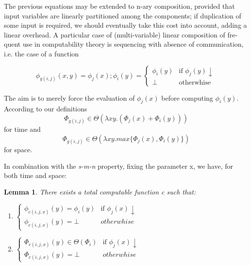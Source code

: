 \documentclass[10pt, a4paper, oneside, titlepage, draft]{article}
\newtheorem{lemma}[shrd]{Lemma}
\begin{document}
The previous equations may be extended to n-ary composition, provided that input variables are linearly partitioned among the components; if duplication of some input is required, we should eventually take this cost into account, adding a linear overhead. A particular case of (multi-variable) linear composition of fre- quent use in computability theory is sequencing with absence of communication, i.e. the case of a function

\begin{equation*}
    \phi_{g(i,j)}(x,y) = \phi_j(x);\phi_i(y) = 
    \begin{cases}
        \phi_i(y)   & \text{if } \phi_j(y)\downarrow    \\
        \bot        & \text{otherwhise}
    \end{cases}
\end{equation*}

\noindent The aim is to merely force the evaluation of $\phi_j(x)$ before computing $\phi_i(y)$. According to our definitions
\begin{equation*}
    \Phi_{g(i,j)} \in \Theta ( \lambda xy . ( \Phi_j(x) + \Phi_i(y) ) )
\end{equation*}
for time and
\begin{equation*}
    \Phi_{g(i,j)} \in \Theta ( \lambda xy . max \{ \Phi_j(x) , \Phi_i(y) \} )
\end{equation*}
for space.

In combination with the \emph{s-m-n} property, fixing the parameter x, we have, for both time and space:

\begin{lemma}
    There exists a total computable function c such that:
    \begin{enumerate}[label=(\alph*)]
        \item $
            \begin{cases}
                \phi_{c(i,j,x)}(y) = \phi_i(y)  & \text{if  } \phi_j(x)\downarrow \\
                \phi_{c(i,j,x)}(y) = \bot       & otherwhise
            \end{cases}
        $

        \item $
            \begin{cases}
                \Phi_{c(i,j,x)}(y) \in \Theta ( \Phi_i )  & \text{if  } \phi_j(x)\downarrow \\
                \Phi_{c(i,j,x)}(y) = \bot       & otherwhise
            \end{cases}
        $
    \end{enumerate}
\end{lemma}
\end{document}
